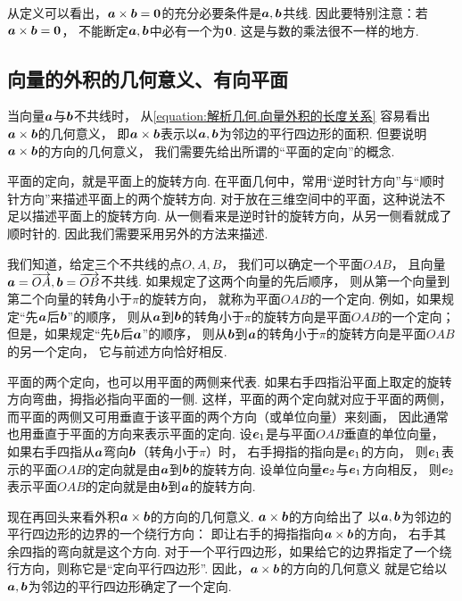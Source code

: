 从定义可以看出，\(\boldsymbol{a}\times\boldsymbol{b}=\boldsymbol{0}\)的充分必要条件是\(\boldsymbol{a},\boldsymbol{b}\)共线.
因此要特别注意：若\(\boldsymbol{a}\times\boldsymbol{b}=\boldsymbol{0}\)，
不能断定\(\boldsymbol{a},\boldsymbol{b}\)中必有一个为\(\boldsymbol{0}\).
这是与数的乘法很不一样的地方.

\subsection{向量的外积的几何意义、有向平面}
当向量\(\boldsymbol{a}\)与\(\boldsymbol{b}\)不共线时，
从\cref{equation:解析几何.向量外积的长度关系} 容易看出\(\boldsymbol{a}\times\boldsymbol{b}\)的几何意义，
即\(\boldsymbol{a}\times\boldsymbol{b}\)表示以\(\boldsymbol{a},\boldsymbol{b}\)为邻边的平行四边形的面积.
但要说明\(\boldsymbol{a}\times\boldsymbol{b}\)的方向的几何意义，
我们需要先给出所谓的“平面的定向”的概念.

平面的定向，就是平面上的旋转方向.
在平面几何中，常用“逆时针方向”与“顺时针方向”来描述平面上的两个旋转方向.
对于放在三维空间中的平面，这种说法不足以描述平面上的旋转方向.
从一侧看来是逆时针的旋转方向，从另一侧看就成了顺时针的.
因此我们需要采用另外的方法来描述.

我们知道，给定三个不共线的点\(O,A,B\)，
我们可以确定一个平面\(OAB\)，
且向量\(\boldsymbol{a}=\overrightarrow{OA},
\boldsymbol{b}=\overrightarrow{OB}\)不共线.
如果规定了这两个向量的先后顺序，
则从第一个向量到第二个向量的转角小于\(\pi\)的旋转方向，
就称为平面\(OAB\)的一个定向.
例如，如果规定“先\(\boldsymbol{a}\)后\(\boldsymbol{b}\)”的顺序，
则从\(\boldsymbol{a}\)到\(\boldsymbol{b}\)的转角小于\(\pi\)的旋转方向是平面\(OAB\)的一个定向；
但是，如果规定“先\(\boldsymbol{b}\)后\(\boldsymbol{a}\)”的顺序，
则从\(\boldsymbol{b}\)到\(\boldsymbol{a}\)的转角小于\(\pi\)的旋转方向是平面\(OAB\)的另一个定向，
它与前述方向恰好相反.

平面的两个定向，也可以用平面的两侧来代表.
如果右手四指沿平面上取定的旋转方向弯曲，拇指必指向平面的一侧.
这样，平面的两个定向就对应于平面的两侧，
而平面的两侧又可用垂直于该平面的两个方向（或单位向量）来刻画，
因此通常也用垂直于平面的方向来表示平面的定向.
设\(\boldsymbol{e}_1\)是与平面\(OAB\)垂直的单位向量，
如果右手四指从\(\boldsymbol{a}\)弯向\(\boldsymbol{b}\)（转角小于\(\pi\)）时，
右手拇指的指向是\(\boldsymbol{e}_1\)的方向，
则\(\boldsymbol{e}_1\)表示的平面\(OAB\)的定向就是由\(\boldsymbol{a}\)到\(\boldsymbol{b}\)的旋转方向.
设单位向量\(\boldsymbol{e}_2\)与\(\boldsymbol{e}_1\)方向相反，
则\(\boldsymbol{e}_2\)表示平面\(OAB\)的定向就是由\(\boldsymbol{b}\)到\(\boldsymbol{a}\)的旋转方向.

现在再回头来看外积\(\boldsymbol{a}\times\boldsymbol{b}\)的方向的几何意义.
\(\boldsymbol{a}\times\boldsymbol{b}\)的方向给出了
以\(\boldsymbol{a},\boldsymbol{b}\)为邻边的平行四边形的边界的一个绕行方向：
即让右手的拇指指向\(\boldsymbol{a}\times\boldsymbol{b}\)的方向，
右手其余四指的弯向就是这个方向.
对于一个平行四边形，如果给它的边界指定了一个绕行方向，则称它是“定向平行四边形”.
因此，\(\boldsymbol{a}\times\boldsymbol{b}\)的方向的几何意义
就是它给以\(\boldsymbol{a},\boldsymbol{b}\)为邻边的平行四边形确定了一个定向.

